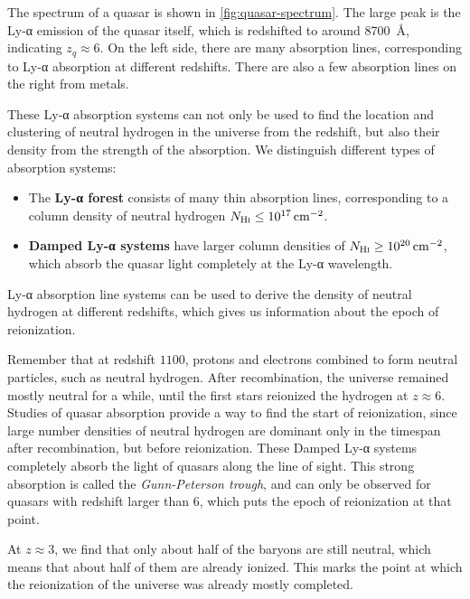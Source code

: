 The spectrum of a quasar is shown in \cref{fig:quasar-spectrum}.
The large peak is the Ly-α emission of the quasar itself, which is redshifted to around \SI{8700}{\angstrom}, indicating $z_q \approx 6$.
On the left side, there are many absorption lines, corresponding to Ly-α absorption at different redshifts.
There are also a few absorption lines on the right from metals.

These Ly-α absorption systems can not only be used to find the location and clustering of neutral hydrogen in the universe from the redshift, but also their density from the strength of the absorption.
We distinguish different types of absorption systems:
\begin{itemize}
	\item The \textbf{Ly-α forest} consists of many thin absorption lines,
	corresponding to a column density of neutral hydrogen $N_{\mathrm{H}\textsc{i}} \leq \SI{e17}{\centi\meter\tothe{-2}}$.
	\item \textbf{Damped Ly-α systems} have larger column densities of $N_{\mathrm{H}\textsc{i}} \geq \SI{e20}{\centi\meter\tothe{-2}}$,
	which absorb the quasar light completely at the Ly-α wavelength.
\end{itemize}

Ly-α absorption line systems can be used to derive the density of neutral hydrogen at different redshifts, which gives us information about the epoch of reionization.

Remember that at redshift $1100$, protons and electrons combined to form neutral particles, such as neutral hydrogen.
After recombination, the universe remained mostly neutral for a while, until the first stars reionized the hydrogen at $z \approx 6$.
Studies of quasar absorption provide a way to find the start of reionization, since large number densities of neutral hydrogen are dominant only in the timespan after recombination, but before reionization.
These Damped Ly-α systems completely absorb the light of quasars along the line of sight.
This strong absorption is called the \emph{Gunn-Peterson trough}, and can only be observed for quasars with redshift larger than $6$, which puts the epoch of reionization at that point.

At $z \approx 3$, we find that only about half of the baryons are still neutral, which means that about half of them are already ionized.
This marks the point at which the reionization of the universe was already mostly completed.



